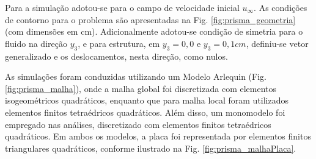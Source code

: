 \documentclass[tese_patricia]{subfiles}
\begin{document}
Para a simulação adotou-se para o campo de velocidade inicial $u_{\infty}$. As condições de contorno para o problema são apresentadas na Fig. \ref{fig:prisma_geometria} (com dimensões em cm). Adicionalmente adotou-se condição de simetria para o fluido na direção $y_3$, e para estrutura, em $y_3=0,0$ e $y_3=0,1cm$, definiu-se vetor generalizado e os deslocamentos, nesta direção, como nulos.

As simulações foram conduzidas utilizando um Modelo Arlequin (Fig. \ref{fig:prisma_malha}), onde a malha global foi discretizada com elementos isogeométricos quadráticos, enquanto que para malha local foram utilizados elementos finitos tetraédricos quadráticos. Além disso, um monomodelo foi empregado nas análises, discretizado com elementos finitos tetraédricos quadráticos. Em ambos os modelos, a placa foi representada por elementos finitos triangulares quadráticos, conforme ilustrado na Fig. \ref{fig:prisma_malhaPlaca}.
\end{document}
